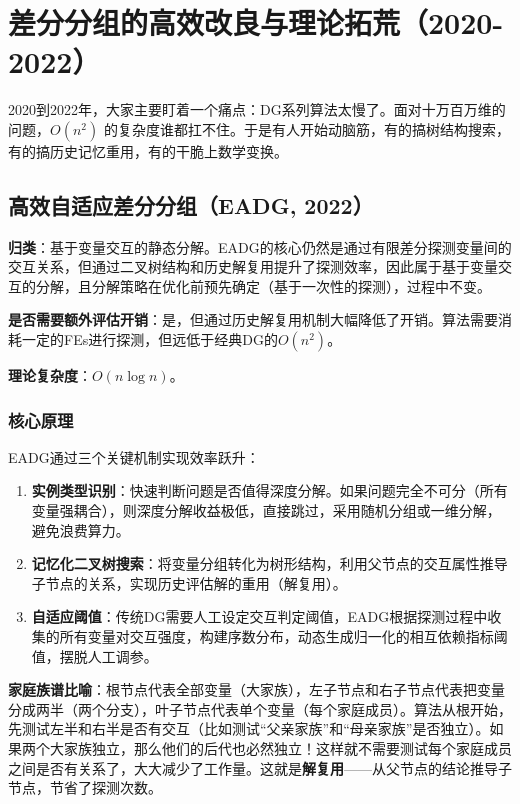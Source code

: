 \section{差分分组的高效改良与理论拓荒（2020-2022）}
2020到2022年，大家主要盯着一个痛点：DG系列算法太慢了。面对十万百万维的问题，$O(n^2)$ 的复杂度谁都扛不住。于是有人开始动脑筋，有的搞树结构搜索，有的搞历史记忆重用，有的干脆上数学变换。

\subsection{高效自适应差分分组（EADG, 2022）}
\textbf{归类}：基于变量交互的静态分解。EADG的核心仍然是通过有限差分探测变量间的交互关系，但通过二叉树结构和历史解复用提升了探测效率，因此属于基于变量交互的分解，且分解策略在优化前预先确定（基于一次性的探测），过程中不变。

\textbf{是否需要额外评估开销}：是，但通过历史解复用机制大幅降低了开销。算法需要消耗一定的FEs进行探测，但远低于经典DG的$O(n^2)$。

\textbf{理论复杂度}：$O(n \log n)$。

\subsubsection*{核心原理}
EADG通过三个关键机制实现效率跃升：
\begin{enumerate}
    \item \textbf{实例类型识别}：快速判断问题是否值得深度分解。如果问题完全不可分（所有变量强耦合），则深度分解收益极低，直接跳过，采用随机分组或一维分解，避免浪费算力。
    \item \textbf{记忆化二叉树搜索}：将变量分组转化为树形结构，利用父节点的交互属性推导子节点的关系，实现历史评估解的重用（解复用）。
    \item \textbf{自适应阈值}：传统DG需要人工设定交互判定阈值，EADG根据探测过程中收集的所有变量对交互强度，构建序数分布，动态生成归一化的相互依赖指标阈值，摆脱人工调参。
\end{enumerate}

\textbf{家庭族谱比喻}：根节点代表全部变量（大家族），左子节点和右子节点代表把变量分成两半（两个分支），叶子节点代表单个变量（每个家庭成员）。算法从根开始，先测试左半和右半是否有交互（比如测试“父亲家族”和“母亲家族”是否独立）。如果两个大家族独立，那么他们的后代也必然独立！这样就不需要测试每个家庭成员之间是否有关系了，大大减少了工作量。这就是\textbf{解复用}——从父节点的结论推导子节点，节省了探测次数。

